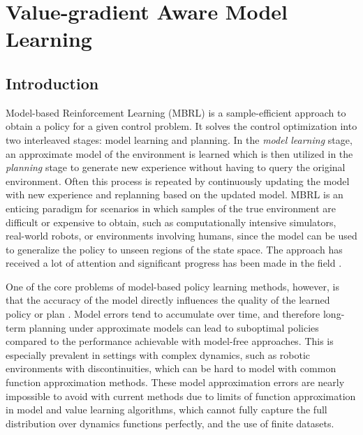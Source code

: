 \chapter{Value-gradient Aware Model Learning}

\newcommand{\revised}[1]{#1}
\section{Introduction}
Model-based Reinforcement Learning (MBRL) is a sample-efficient approach to obtain a policy for a given control problem. It solves the control optimization into two interleaved stages: model learning and planning. In the \emph{model learning} stage, an approximate model of the environment is learned which is then utilized in the \emph{planning} stage to generate new experience without having to query the original environment. Often this process is repeated by continuously updating the model with new experience and replanning based on the updated model. MBRL  is an enticing paradigm for scenarios in which samples of the true environment are difficult or expensive to obtain, such as computationally intensive simulators, real-world robots, or environments involving humans, since the model can be used to generalize the policy to unseen regions of the state space. The approach has received a lot of attention and significant progress has been made in the field \parencite{dyna,deisenroth2011pilco,levine2013guided,Hafner2020Dream,moerland,schrittwieser2020mastering}.

One of the core problems of model-based policy learning methods, however, is that the accuracy of the model directly influences the quality of the learned policy or plan \parencite{schneider1997exploiting,kearns2002near,ross2012agnostic,talvitie2017self,luo2018algorithmic,mbpo}. 
Model errors tend to accumulate over time, and therefore long-term planning under approximate models can lead to suboptimal policies compared to the performance achievable with model-free approaches.
This is especially prevalent in settings with complex dynamics, such as robotic environments with discontinuities, which can be hard to model with common function approximation methods.
These model approximation errors are nearly impossible to avoid with current methods due to limits of function approximation in model and value learning algorithms, which cannot fully capture the full distribution over dynamics functions perfectly, and the use of finite datasets.

